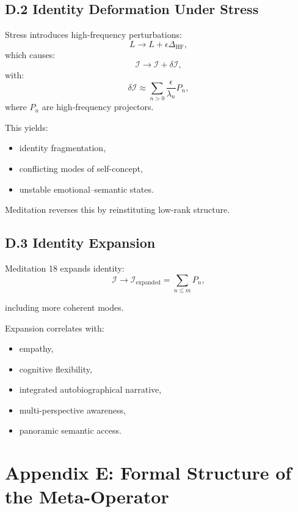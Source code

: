\documentclass[12pt]{article}
\begin{document}
\subsection*{D.2 Identity Deformation Under Stress}

Stress introduces high-frequency perturbations:
\[
L \to L + \epsilon \Delta_{\text{HF}},
\]
which causes:
\[
\mathcal{I} \to \mathcal{I} + \delta\mathcal{I},
\]
with:
\[
\delta\mathcal{I} \approx
\sum_{n>0} \frac{\epsilon}{\lambda_n} P_n,
\]
where $P_n$ are high-frequency projectors.

This yields:
\begin{itemize}
\item identity fragmentation,
\item conflicting modes of self-concept,
\item unstable emotional–semantic states.
\end{itemize}

Meditation reverses this by reinstituting low-rank structure.

\subsection*{D.3 Identity Expansion}

Meditation 18 expands identity:
\[
\mathcal{I} \to \mathcal{I}_{\text{expanded}}
=
\sum_{n \le m} P_n,
\]

including more coherent modes.

Expansion correlates with:
\begin{itemize}
\item empathy,
\item cognitive flexibility,
\item integrated autobiographical narrative,
\item multi-perspective awareness,
\item panoramic semantic access.
\end{itemize}


\section*{Appendix E: Formal Structure of the Meta-Operator}
\end{document}
